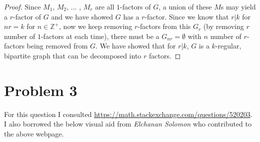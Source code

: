 \documentclass[11pt]{article}
\begin{document}
\begin{proof}
Since $M_1$, $M_2$, ... , $M_r$ are all $1$-factors of $G$, a union of these $M$s may yield a $r$-factor of $G$ and we have showed $G$ has a $r$-factor. Since we know that $r | k$ for $nr = k$ for $n \in \mathbb{Z}^+$, now we keep removing $r$-factors from this $G_r$ (by removing $r$ number of $1$-factors at each time), there must be a $G_{nr} = \emptyset$ with $n$ number of $r$-factors being removed from $G$. We have showed that for $r | k$, $G$ is a $k$-regular, bipartite graph that can be decomposed into $r$ factors.

\end{proof}






\section{Problem 3}


For this question I consulted \url{https://math.stackexchange.com/questions/520203}. I also borrowed the below visual aid from \textit{Elchanan Solomon} who contributed to the above webpage.
\end{document}
